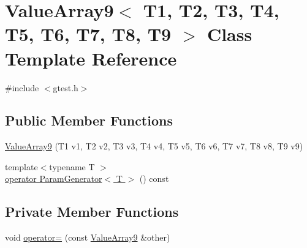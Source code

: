\hypertarget{classtesting_1_1internal_1_1ValueArray9}{\section{\-Value\-Array9$<$ \-T1, \-T2, \-T3, \-T4, \-T5, \-T6, \-T7, \-T8, \-T9 $>$ \-Class \-Template \-Reference}
\label{d3/de2/classtesting_1_1internal_1_1ValueArray9}
}


{\ttfamily \#include $<$gtest.\-h$>$}

\subsection*{\-Public \-Member \-Functions}
\begin{DoxyCompactItemize}
\item 
\hyperlink{classtesting_1_1internal_1_1ValueArray9_a002729a6d00b141d2de0a3ecdcb2227a}{\-Value\-Array9} (\-T1 v1, \-T2 v2, \-T3 v3, \-T4 v4, \-T5 v5, \-T6 v6, \-T7 v7, \-T8 v8, \-T9 v9)
\item 
{\footnotesize template$<$typename T $>$ }\\\hyperlink{classtesting_1_1internal_1_1ValueArray9_a08ef46fa12c9dd8ef6fc630baeea89b7}{operator Param\-Generator$<$ T $>$} () const 
\end{DoxyCompactItemize}
\subsection*{\-Private \-Member \-Functions}
\begin{DoxyCompactItemize}
\item 
void \hyperlink{classtesting_1_1internal_1_1ValueArray9_a2d7753ab9ba019bea14a44e2129d0b65}{operator=} (const \hyperlink{classtesting_1_1internal_1_1ValueArray9}{\-Value\-Array9} \&other)
\end{DoxyCompactItemize}

